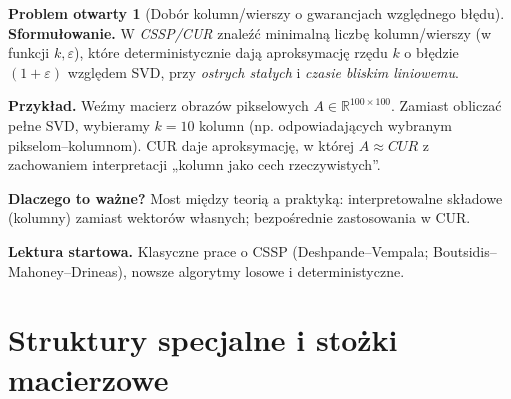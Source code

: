 \documentclass[11pt,a4paper]{article}
\theoremstyle{definition}
\newtheorem{openproblem}{Problem otwarty}
\newcommand{\RR}{\mathbb{R}}
\begin{document}
\begin{openproblem}[Dobór kolumn/wierszy o gwarancjach względnego błędu]\label{prob:CSSP}
\textbf{Sformułowanie.} W \emph{CSSP/CUR} znaleźć minimalną liczbę kolumn/wierszy (w funkcji \(k,\varepsilon\)), które deterministycznie dają aproksymację rzędu \(k\) o błędzie \((1+\varepsilon)\) względem SVD, przy \emph{ostrych stałych} i \emph{czasie bliskim liniowemu}.

\textbf{Przykład.} Weźmy macierz obrazów pikselowych \(A\in\RR^{100\times 100}\). Zamiast obliczać pełne SVD, wybieramy \(k=10\) kolumn (np. odpowiadających wybranym pikselom–kolumnom). CUR daje aproksymację, w której \(A\approx CUR\) z zachowaniem interpretacji „kolumn jako cech rzeczywistych”.

\textbf{Dlaczego to ważne?} Most między teorią a praktyką: interpretowalne składowe (kolumny) zamiast wektorów własnych; bezpośrednie zastosowania w CUR.

\textbf{Lektura startowa.} Klasyczne prace o CSSP (Deshpande–Vempala; Boutsidis–Mahoney–Drineas), nowsze algorytmy losowe i deterministyczne.
\end{openproblem}

\section{Struktury specjalne i stożki macierzowe}
\end{document}

